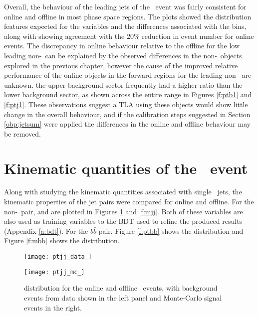     Overall, the behaviour of the leading jets of the \VBFHBB\ event was fairly consistent for online and offline in most phase space regions. The plots showed the distribution features expected for the variables and the differences associated with the \mbb bins, along with showing agreement with the $20\%$ reduction in event number for online events. The discrepancy in online behaviour relative to the offline for the low \pt leading non-\bjets\ can be explained by the observed differences in the non-\bjet\ objects explored in the previous chapter, however the cause of the improved relative performance of the online objects in the forward regions for the leading non-\bjet\ are unknown. the upper background sector frequently had a higher ratio than the lower background sector, as shown across the entire \pt range in Figures \ref{f:ptb1} and \ref{f:ptj1}. These observations suggest a TLA using these objects would show little change in the overall behaviour, and if the calibration steps suggested in Section \ref{obp:jetsum} were applied the differences in the online and offline behaviour may be removed.


\section{Kinematic quantities of the \VBFHBB\ event}

	Along with studying the kinematic quantities associated with single \VBFHBB\ jets, the kinematic properties of the jet pairs were compared for online and offline. For the non-\bjet\ pair, \ptjj and \mjj are plotted in Figures \ref{f:ptjj} and \ref{f:mjj}. Both of these variables are also used as training variables to the BDT used to refine the produced results (Appendix \ref{a:bdt}). For the $b\bar{b}$ pair. Figure \ref{f:ptbb} shows the \ptbb distribution and Figure \ref{f:mbb} shows the \mbb distribution.

        \begin{figure}[h]
            \centering
            \begin{minipage}[h]{0.48\linewidth}
                \texttt{[image: ptjj\_data\_]}
            \end{minipage}
            \quad
            \begin{minipage}[h]{0.48\linewidth}
                \texttt{[image: ptjj\_mc\_]}
            \end{minipage}
            \caption[Comparison of the \ptjj distribution of the \VBFHBB\ events for HLT and offline objects]{\ptjj distribution for the online and offline \VBFHBB\ events, with background events from data shown in the left panel and Monte-Carlo signal events in the right.}
        	\label{f:ptjj}
        \end{figure}

